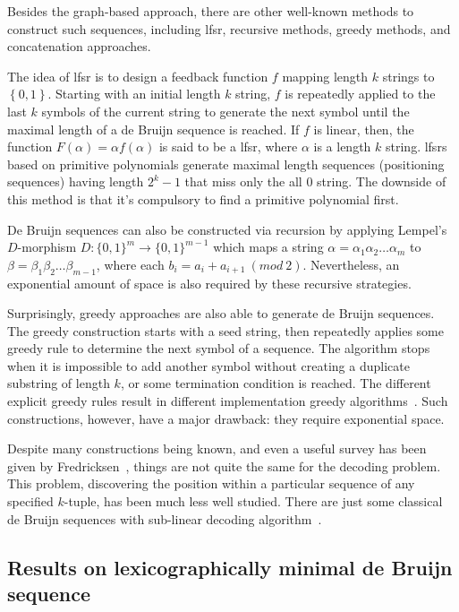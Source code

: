 Besides the graph-based approach, there are other well-known methods to construct such sequences, including \gls{lfsr}, recursive methods, greedy methods, and concatenation approaches.

The idea of \gls{lfsr} is to design a feedback function $f$ mapping length $k$ strings to $\left\{0,1\right\}$. Starting with an initial length $k$ string, $f$ is repeatedly applied to the last $k$ symbols of the current string to generate the next symbol until the maximal length of a de Bruijn sequence is reached. If $f$ is linear, then, the function $F(\alpha)= \alpha f(\alpha)$ is said to be a \gls{lfsr}, where $\alpha$ is a length $k$ string. \gls{lfsr}s based on primitive polynomials generate maximal length sequences (positioning sequences) having length $2^{k}-1$ that miss only the all $0$ string. The downside of this method is that it's compulsory to find a primitive polynomial first.

De Bruijn sequences can also be constructed via recursion by applying Lempel's $D$-morphism $D:\{0,1\}^{m}\to\{0,1\}^{m-1}$ which maps a string $\alpha = \alpha_{1}\alpha_{2}\ldots\alpha_{m}$ to $\beta = \beta_{1}\beta_{2}\ldots\beta_{m-1}$, where each $b_{i} = a_{i} + a_{i+1}\ (mod\ 2)$. Nevertheless, an exponential amount of space is also required by these recursive strategies. 

Surprisingly, greedy approaches are also able to generate de Bruijn sequences. The greedy construction starts with a seed string, then repeatedly applies some greedy rule to determine the next symbol of a sequence. The algorithm stops when it is impossible to add another symbol without creating a duplicate substring of length $k$, or some termination condition is reached. The different explicit greedy rules result in different implementation greedy algorithms~\cite{martin1934problem,alhakim2010simple,fredricksen1982survey,alhakim2021revisiting}. Such constructions, however, have a major drawback: they require exponential space.

Despite many constructions being known, and even a useful survey has been given by Fredricksen~\cite{fredricksen1982survey}, things are not quite the same for the decoding problem. This problem, discovering the position within a particular sequence of any specified $k$-tuple, has been much less well studied. There are just some classical de Bruijn sequences with sub-linear decoding algorithm~\cite{mitchell1996method,tuliani2001bruijn,kociumaka2016efficient}. 

\subsection{Results on lexicographically minimal de Bruijn sequence}

